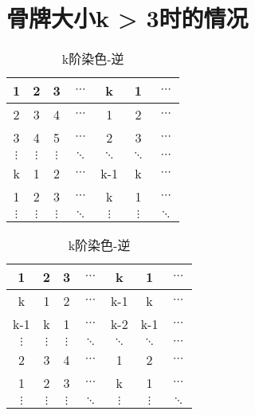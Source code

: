 \section{骨牌大小k > 3时的情况}

\begin{table}[h]
	\caption{k阶染色}
	\label{fig:k-order-staining}
	\begin{subtable}{.5\linewidth}
		\centering
		\caption{k阶正染色}
		\begin{tabular}{|c|c|c|c|c|c|c|}
			\hline
			1        & 2        & 3        & $\cdots$ & k        & 1        & $\cdots$ \\
			\hline
			2        & 3        & 4        & $\cdots$ & 1        & 2        & $\cdots$ \\
			\hline
			3        & 4        & 5        & $\cdots$ & 2        & 3        & $\cdots$ \\
			\hline
			$\vdots$ & $\vdots$ & $\vdots$ & $\ddots$ & $\ddots$ & $\ddots$ & $\cdots$ \\
			\hline
			k        & 1        & 2        & $\cdots$ & k-1      & k        & $\cdots$ \\
			\hline
			1        & 2        & 3        & $\cdots$ & k        & 1        & $\cdots$ \\
			\hline
			$\vdots$ & $\vdots$ & $\vdots$ & $\ddots$ & $\vdots$ & $\vdots$ & $\ddots$ \\
			\hline
		\end{tabular}
		\label{fig:k-order-staining-1}
	\end{subtable}%
	\begin{subtable}{.5\linewidth}
		\centering
		\caption{k阶染色-逆}
		\begin{tabular}{|c|c|c|c|c|c|c|}
			\hline
			1        & 2        & 3        & $\cdots$ & k        & 1        & $\cdots$ \\
			\hline
			k        & 1        & 2        & $\cdots$ & k-1      & k        & $\cdots$ \\
			\hline
			k-1      & k        & 1        & $\cdots$ & k-2      & k-1      & $\cdots$ \\
			\hline
			$\vdots$ & $\vdots$ & $\vdots$ & $\ddots$ & $\ddots$ & $\ddots$ & $\cdots$ \\
			\hline
			2        & 3        & 4        & $\cdots$ & 1        & 2        & $\cdots$ \\
			\hline
			1        & 2        & 3        & $\cdots$ & k        & 1        & $\cdots$ \\
			\hline
			$\vdots$ & $\vdots$ & $\vdots$ & $\ddots$ & $\vdots$ & $\vdots$ & $\ddots$ \\
			\hline
		\end{tabular}
		\label{fig:k-order-staining-2}
	\end{subtable}
\end{table}


